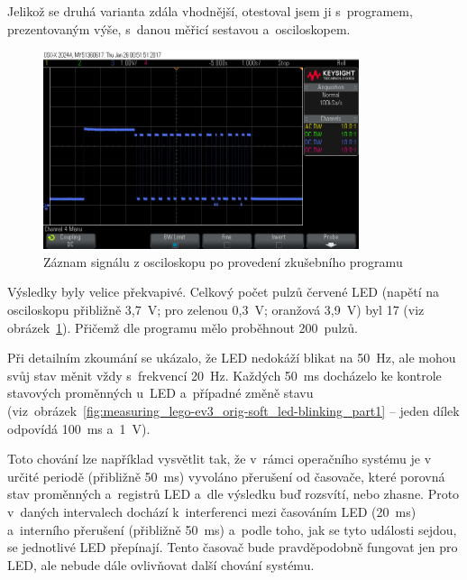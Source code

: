 Jelikož se druhá varianta zdála vhodnější, otestoval jsem ji s~programem, prezentovaným výše, s~danou měřicí sestavou a~osciloskopem. 

\begin{figure}[h]
	\centering
	\includegraphics[width=350px]{images/measuring-oscilloscope_ev3-software_led-blinking_all.png}
	\caption[Záznam signálu z osciloskopu po provedení zkušebního programu]{Záznam signálu z osciloskopu po provedení zkušebního programu}
	\label{fig:measuring_lego-ev3_orig-soft_led-blinking_all}
\end{figure}

Výsledky byly velice překvapivé. Celkový počet pulzů červené LED (napětí na osciloskopu přibližně 3,7~V; pro zelenou 0,3~V; oranžová 3,9~V) byl 17 
(viz obrázek~\ref{fig:measuring_lego-ev3_orig-soft_led-blinking_all}). Přičemž dle programu mělo proběhnout 200~pulzů.  

Při detailním zkoumání se ukázalo, že LED nedokáží blikat na 50~Hz, ale mohou svůj stav měnit vždy s~frekvencí 20~Hz. 
Každých 50~ms docházelo ke kontrole stavových proměnných u~LED a~případné změně stavu (viz~obrázek~\ref{fig:measuring_lego-ev3_orig-soft_led-blinking_part1} -- jeden dílek odpovídá 100~ms a~1~V).

Toto chování lze například vysvětlit tak, že v~rámci operačního systému  je v určité periodě (přibližně 50~ms) vyvoláno přerušení od časovače, které porovná stav proměnných a~registrů LED a~dle výsledku buď rozsvítí, nebo zhasne. 
Proto v~daných intervalech dochází k~interferenci mezi časováním LED (20~ms) a~interního přerušení (přibližně 50~ms) a~podle toho, jak se tyto události sejdou, se jednotlivé LED přepínají.
Tento časovač bude pravděpodobně fungovat jen pro LED, ale nebude dále ovlivňovat další chování systému.
 
